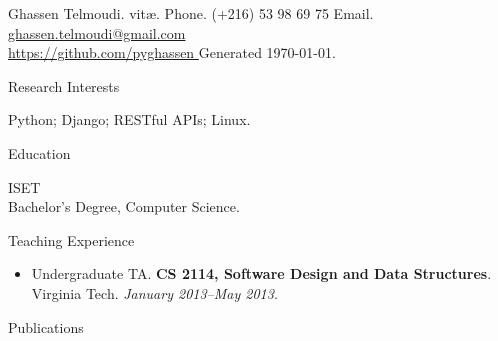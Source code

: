\documentclass[letter]{article}
\begin{document}
{\huge Ghassen Telmoudi. vit\ae.} \hfill
{Phone.} {\small (+216) 53 98 69 75} \hspace{2mm}
{Email.} {\small \href{mailto: ghassen.telmoudi@gmail.com }{ ghassen.telmoudi@gmail.com }} \\
\url{ https://github.com/pyghassen } \hfill Generated \today.
\vspace{3mm}

\medskip

\begin{minipage}{\textwidth}
{\huge Research Interests }


  Python; Django; RESTful APIs; Linux.
  \bigskip

\end{minipage}\medskip

\begin{minipage}{\textwidth}
{\huge Education }


  
    {\large ISET } \hfill  \\
    Bachelor's Degree, Computer Science.\hfill {\it }
    \bigskip
  

\end{minipage}\medskip

\begin{minipage}{\textwidth}
{\huge Teaching Experience }


  \begin{itemize}
    
      \item
        Undergraduate TA.
        {\bf CS 2114, Software Design and Data Structures}.
        Virginia Tech.
        {\it January 2013--May 2013}.
    
  \end{itemize}

\end{minipage}\medskip

\begin{minipage}{\textwidth}
{\huge Publications }


  \nocite{*}
  \printbibliography[heading=none,type=inproceedings,prefixnumbers=C]
  \end{minipage}
  \begin{minipage}{\textwidth}
  \printbibliography[
    heading=none,type=article,keyword=journal,
    resetnumbers=true,prefixnumbers=J
  ]
  \printbibliography[
    heading=none,type=article,keyword=magazine,
    resetnumbers=true,prefixnumbers=M
  ]
  \bigskip


\end{minipage}\medskip
\end{document}
